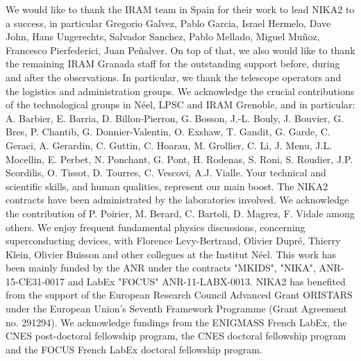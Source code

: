 \documentclass[]{aa} %
\begin{document}


\begin{acknowledgements}
We would like to thank the IRAM team in Spain for their work to lead NIKA2 to a success, in particular Gregorio Galvez, Pablo Garcia, Israel Hermelo, Dave John, Hans Ungerechts, Salvador Sanchez, Pablo Mellado, Miguel Mu\~noz, Francesco Pierfederici, Juan Pe\~nalver. On top of that, we also would like to thank the remaining IRAM Granada staff for the outstanding support before, during and after the observations. In particular, we thank the telescope operators and the logistics and administration groups. We acknowledge the crucial contributions of the technological groups in N\'eel, LPSC and IRAM Grenoble, and in particular: A. Barbier, E. Barria, D. Billon-Pierron, G. Bosson, J.-L. Bouly, J. Bouvier, G. Bres, P. Chantib, G. Donnier-Valentin,  O. Exshaw, T. Gandit, G. Garde, C. Geraci, A. Gerardin, C. Guttin, C. Hoarau, M. Grollier, C. Li, J. Menu, J.L. Mocellin, E. Perbet, N. Ponchant, G. Pont, H. Rodenas, S. Roni, S. Roudier, J.P. Scordilis, O. Tissot, D. Tourres, C. Vescovi, A.J. Vialle. Your technical and scientific skills, and human qualities, represent our main boost.  The NIKA2 contracts have been administrated by the laboratories involved. We acknowledge the contribution of P. Poirier, M. Berard, C. Bartoli, D. Magrez, F. Vidale among others. We enjoy frequent fundamental physics discussions, concerning superconducting devices, with Florence Levy-Bertrand, Olivier Dupr\'e, Thierry Klein, Olivier Buisson and other collegues at the Institut N\'eel. This work has been mainly funded by the ANR under the contracts "MKIDS", "NIKA", ANR-15-CE31-0017 and LabEx "FOCUS" ANR-11-LABX-0013. NIKA2 has benefited from the support of the European Research Council Advanced Grant ORISTARS under the European Union's Seventh Framework Programme (Grant Agreement no. 291294). We acknowledge fundings from the ENIGMASS French LabEx, the CNES post-doctoral fellowship program, the CNES doctoral fellowship program and the FOCUS French LabEx doctoral fellowship program.

\end{acknowledgements}


%
%


%
% 
\end{document}
